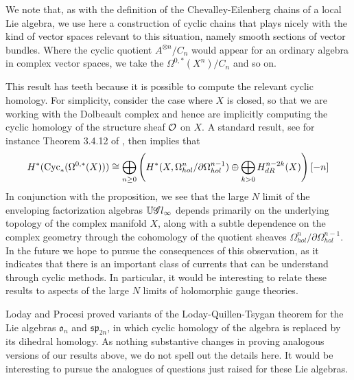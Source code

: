 \begin{rmk}
We note that, as with the definition of the Chevalley-Eilenberg chains of a local Lie algebra,
we use here a construction of cyclic chains that plays nicely with the kind of vector spaces relevant to this situation,
namely smooth sections of vector bundles.
Where the cyclic quotient $A^{\otimes n}/C_n$ would appear for an ordinary algebra in complex vector spaces,
we take the $\Omega^{0,*}(X^n)/C_n$ and so on.
\end{rmk}


This result has teeth because it is possible to compute the relevant cyclic homology.
For simplicity, consider the case where $X$ is closed, 
so that we are working with the Dolbeault complex and hence are implicitly computing the cyclic homology of the structure sheaf $\mathcal O$ on $X$.
A standard result, see for instance Theorem 3.4.12 of \cite{LodayCyclic}, then implies that
\[
H^*({\rm Cyc}_*(\Omega^{0,*}(X))) \cong \bigoplus_{n \geq 0} \left( H^*(X, \Omega^n_{hol}/\partial \Omega^{n-1}_{hol}) \oplus \bigoplus_{k > 0} H^{n-2k}_{dR}(X) \right)[-n]
\]
In conjunction with the proposition, we see that the large $N$ limit of the enveloping factorization algebras $\mathbb U \mathscr G l_\infty$ depends primarily on the underlying topology of the complex manifold $X$, 
along with a subtle dependence on the complex geometry through the cohomology of the quotient sheaves $\Omega^n_{hol}/\partial \Omega^{n-1}_{hol}$.
In the future we hope to pursue the consequences of this observation, 
as it indicates that there is an important class of currents that can be understand through cyclic methods.
In particular, it would be interesting to relate these results to aspects of the large $N$ limits of holomorphic gauge theories.

\begin{rmk}
Loday and Procesi proved variants of the Loday-Quillen-Tsygan theorem for the Lie algebras $\mathfrak{o}_n$ and $\mathfrak{sp}_{2n}$,
in which cyclic homology of the algebra is replaced by its dihedral homology.
As nothing substantive changes in proving analogous versions of our results above, 
we do not spell out the details here.
It would be interesting to pursue the analogues of questions just raised for these Lie algebras.
\end{rmk}

